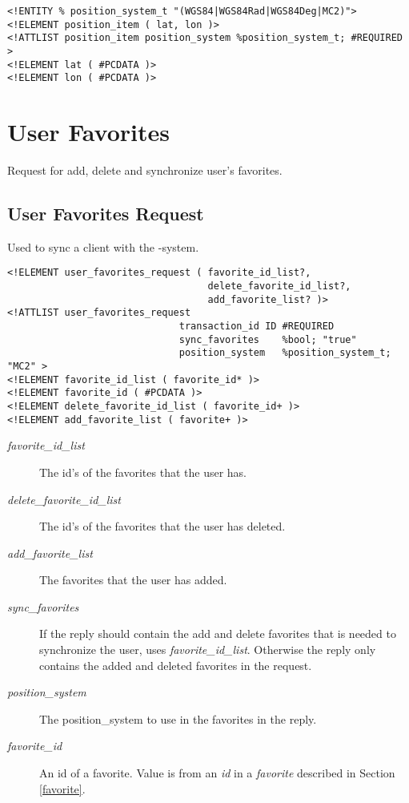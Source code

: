\begin{verbatim}
<!ENTITY % position_system_t "(WGS84|WGS84Rad|WGS84Deg|MC2)">
<!ELEMENT position_item ( lat, lon )>
<!ATTLIST position_item position_system %position_system_t; #REQUIRED >
<!ELEMENT lat ( #PCDATA )>
<!ELEMENT lon ( #PCDATA )>
\end{verbatim}


\section{User Favorites}

Request for add, delete and synchronize user's favorites. 
~\\



\subsection{User Favorites Request}

Used to sync a client with the \mc-system.

\begin{verbatim}
<!ELEMENT user_favorites_request ( favorite_id_list?,
                                   delete_favorite_id_list?,
                                   add_favorite_list? )>
<!ATTLIST user_favorites_request 
                              transaction_id ID #REQUIRED
                              sync_favorites    %bool; "true"
                              position_system   %position_system_t; "MC2" >
<!ELEMENT favorite_id_list ( favorite_id* )>
<!ELEMENT favorite_id ( #PCDATA )>
<!ELEMENT delete_favorite_id_list ( favorite_id+ )>
<!ELEMENT add_favorite_list ( favorite+ )>
\end{verbatim}
\begin{description}
\item[\emph{favorite\_id\_list}] The id's of the favorites that the user
  has.
\item[\emph{delete\_favorite\_id\_list}] The id's of the favorites that the
  user has deleted.
\item[\emph{add\_favorite\_list}] The favorites that the user has added.
\item[\emph{sync\_favorites}] If the reply should contain the add and 
  delete favorites that is needed to synchronize the user, uses
  \emph{favorite\_id\_list}. Otherwise the reply only contains the added
  and deleted favorites in the request.
\item[\emph{position\_system}] The position\_system to use in the favorites
  in the reply.
\item[\emph{favorite\_id}] \label{favoriteid} An id of a favorite. Value is from an \emph{id} in a \emph{favorite} described in Section 
  \ref{favorite}.
\end{description}



